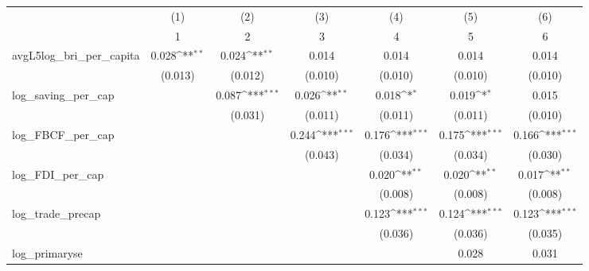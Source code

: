 {
\def\sym#1{\ifmmode^{#1}\else\(^{#1}\)\fi}
\begin{tabular}{l*{6}{c}}
\toprule
            &\multicolumn{1}{c}{(1)}&\multicolumn{1}{c}{(2)}&\multicolumn{1}{c}{(3)}&\multicolumn{1}{c}{(4)}&\multicolumn{1}{c}{(5)}&\multicolumn{1}{c}{(6)}\\
            &\multicolumn{1}{c}{1}&\multicolumn{1}{c}{2}&\multicolumn{1}{c}{3}&\multicolumn{1}{c}{4}&\multicolumn{1}{c}{5}&\multicolumn{1}{c}{6}\\
\midrule
avgL5log\_bri\_per\_capita&       0.028\sym{**} &       0.024\sym{**} &       0.014         &       0.014         &       0.014         &       0.014         \\
            &     (0.013)         &     (0.012)         &     (0.010)         &     (0.010)         &     (0.010)         &     (0.010)         \\
\addlinespace
log\_saving\_per\_cap&                     &       0.087\sym{***}&       0.026\sym{**} &       0.018\sym{*}  &       0.019\sym{*}  &       0.015         \\
            &                     &     (0.031)         &     (0.011)         &     (0.011)         &     (0.011)         &     (0.010)         \\
\addlinespace
log\_FBCF\_per\_cap&                     &                     &       0.244\sym{***}&       0.176\sym{***}&       0.175\sym{***}&       0.166\sym{***}\\
            &                     &                     &     (0.043)         &     (0.034)         &     (0.034)         &     (0.030)         \\
\addlinespace
log\_FDI\_per\_cap&                     &                     &                     &       0.020\sym{**} &       0.020\sym{**} &       0.017\sym{**} \\
            &                     &                     &                     &     (0.008)         &     (0.008)         &     (0.008)         \\
\addlinespace
log\_trade\_precap&                     &                     &                     &       0.123\sym{***}&       0.124\sym{***}&       0.123\sym{***}\\
            &                     &                     &                     &     (0.036)         &     (0.036)         &     (0.035)         \\
\addlinespace
log\_primaryse&                     &                     &                     &                     &       0.028         &       0.031         \\

\end{tabular}}
